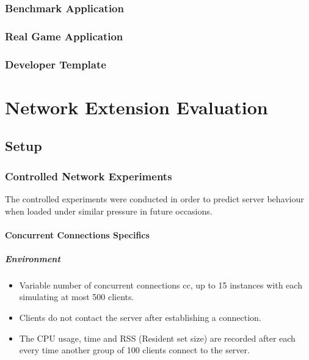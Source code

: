 \documentclass[bsc,frontabs,twoside,singlespacing,parskip,deptreport]{infthesis}     %
\begin{document}
\subsection{Benchmark Application}
\subsection{Real Game Application}
\subsection{Developer Template}







\chapter{Network Extension Evaluation}
\section{Setup}

\subsection{Controlled Network Experiments}
The controlled experiments were conducted in order to predict server behaviour when loaded under similar pressure in future occasions. 

\subsubsection{Concurrent Connections Specifics}
\paragraph{Environment}
\begin{itemize}
\item Variable number of concurrent connections cc, up to 15 instances with each simulating at most 500 clients.
\item Clients do not contact the server after establishing a connection.
\item The CPU usage, time and RSS (Resident set size) are recorded after each every time another group of 100 clients connect to the server.
\end{itemize}
\end{document}
